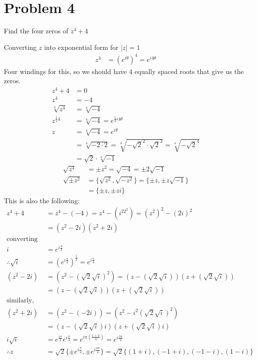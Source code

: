\documentclass{article}
\begin{document}
\newpage

\section*{Problem 4}
Find the four zeros of $z^4+4$

Converting $z$ into exponential form for $|z| = 1$
 \begin{align*}
 z^4 &= (e^{i\theta})^4 = e^{i4\theta}
 \end{align*}
 Four windings for this, so we should have 4 equally spaced roots that give us the zeros.
 \begin{align*}
   z^4+4 &= 0\\
   z^4 &= -4\\
   \sqrt[4]{z^4} &= \sqrt[4]{-4}\\
   z^{\frac{1}{4}4} &= \sqrt[4]{-4} = e^{\frac{1}{4}i4\theta}\\
   z &= \sqrt[4]{-4} = e^{i\theta}\\
         &= \sqrt[4]{-2\cdot 2} = \sqrt[4]{-\sqrt{2}^2\cdot \sqrt{2}^2} = \sqrt[4]{-\sqrt{2}^4}\\
         &= \sqrt{2}\cdot \sqrt[4]{-1} 
 \end{align*}
 \begin{align*}
   \sqrt{z^4} &= \pm z^2 = \sqrt{-4} = \pm 2\sqrt{-1}\\
   \sqrt{\pm z^2} &= \{\sqrt{z^2}, \sqrt{-z^2}\} = \{\pm z, \pm z\sqrt{-1}\}\\
   &= \{\pm z, \pm zi\}
 \end{align*}
 This is also the following:
 \begin{align*}
   z^4 + 4 &= z^4 - (-4) = z^4 - (i^22^2) = (z^2)^2 - (2i)^2\\
           &=(z^2-2i)(z^2+2i)\\
   \text{converting to exponential}\\
   i &= e^{i\frac{\pi}{2}}\\
   \therefore \sqrt{i} &= (e^{i\frac{\pi}{2}})^{\frac{1}{2}} = e^{i\frac{\pi}{4}}\\
   (z^2-2i) &= (z^2-(\sqrt{2}\sqrt{i})^2) = (z-(\sqrt{2}\sqrt{i}))(z+(\sqrt{2}\sqrt{i}))\\
   &= \boxed{(z-(\sqrt{2}\sqrt{i}))(z+(\sqrt{2}\sqrt{i}))}\\
   \text{similarly, for the positive side}\\
   (z^2+2i) &= (z^2-(-2i)) = (z^2-i^2(\sqrt{2}\sqrt{i})^2)\\
           &= \boxed{(z - (\sqrt{2}\sqrt{i})i)(z+(\sqrt{2}\sqrt{i})i)} \\
   i\sqrt{i} &= e^{\frac{i\pi}{2}}e^{i\frac{\pi}{4}} = e^{i\pi(\frac{1+2}{4})} = e^{i\frac{3\pi}{4}}\\
   \therefore z &=\sqrt{2}\{\pm e^{i\frac{\pi}{4}}, \pm e^{i\frac{3\pi}{4}}\} = \sqrt{2}\{(1+i),(-1+i),(-1-i),(1-i)\}
 \end{align*}
 
\end{document}
